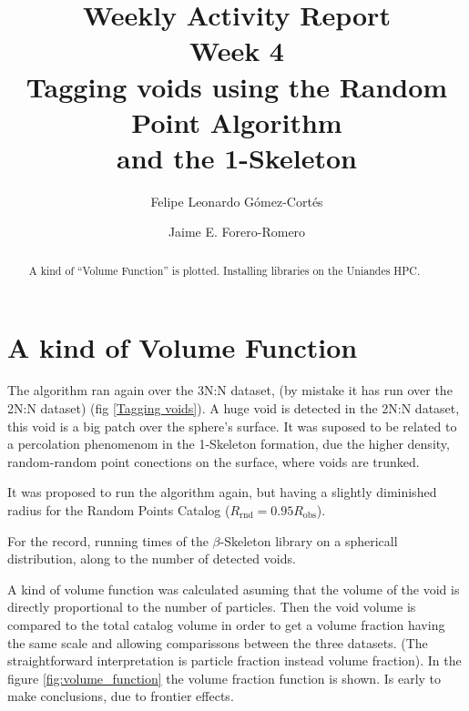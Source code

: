 \documentclass[preprint]{aastex62}
\begin{document}
\title{Weekly Activity Report\\Week 4\\Tagging voids using the Random Point Algorithm\\and the 1-Skeleton}


\author{Felipe Leonardo Gómez-Cortés}

\nocollaboration

\author{Jaime E. Forero-Romero}


\begin{abstract}
  A kind of ``Volume Function'' is plotted. Installing libraries on the Uniandes HPC.
  
\end{abstract}


\section{A kind of Volume Function}

The algorithm ran again over the 3N:N dataset, (by mistake it has run over the 2N:N
dataset) (fig \ref{Tagging voids}). A huge void is detected in the 2N:N dataset, this
void is a big patch over the sphere's surface. It was suposed to be related to a
percolation phenomenom in the 1-Skeleton formation, due the higher density,
random-random point conections on the surface, where voids are trunked.

It was proposed to run the algorithm again, but having a slightly diminished radius
for the Random Points Catalog ($R_{\mathrm{rnd}} = 0.95 R_{\mathrm{obs}}$).

For the record, running times of the $\beta$-Skeleton library on a sphericall
distribution, along to the number of detected voids.

A kind of volume function was calculated asuming that the volume of the void is directly
proportional to the number of particles. Then the void volume is compared to the total
catalog volume in order to get a volume fraction having the same scale and allowing comparissons
between the three datasets. (The straightforward interpretation is particle fraction
instead volume fraction). In the figure \ref{fig:volume_function} the volume fraction
function is shown. Is early to make conclusions, due to frontier effects.
\end{document}
